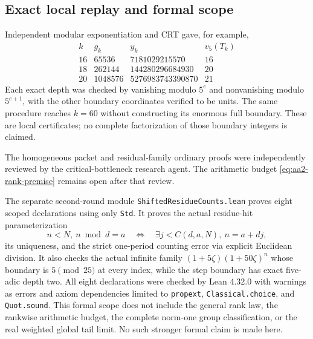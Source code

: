 \subsection{Exact local replay and formal scope}
Independent modular exponentiation and CRT gave, for example,
\[
\begin{array}{c|r|r|c}
k&g_k&y_k&v_5(T_k)\\\hline
16&65536&7181029215570&16\\
18&262144&144280296684930&20\\
20&1048576&5276983743390870&21
\end{array}
\]
Each exact depth was checked by vanishing modulo $5^e$ and nonvanishing
modulo $5^{e+1}$, with the other boundary coordinates verified to be units.
The same procedure reaches $k=60$ without constructing its enormous full
boundary. These are local certificates; no complete factorization of those
boundary integers is claimed.

The homogeneous packet and residual-family ordinary proofs were independently
reviewed by the critical-bottleneck research agent. The arithmetic budget
\eqref{eq:aa2-rank-premise} remains open after that review.

The separate second-round module \texttt{ShiftedResidueCounts.lean} proves
eight scoped declarations using only \texttt{Std}. It proves the actual
residue-hit parameterization
\[
 n<N,\ n\bmod d=a
 \quad\Longleftrightarrow\quad
 \exists j<C(d,a,N),\ n=a+dj,
\]
its uniqueness, and the strict one-period counting error via explicit
Euclidean division. It also checks the actual infinite family
$(1+5\zeta)(1+50\zeta)^n$ whose boundary is $5\pmod{25}$ at every index,
while the step boundary has exact five-adic depth two. All eight declarations
were checked by Lean 4.32.0 with warnings as errors and axiom dependencies
limited to \texttt{propext}, \texttt{Classical.choice}, and \texttt{Quot.sound}.
This formal scope does not include the general rank law, the rankwise
arithmetic budget, the complete norm-one group classification, or the real
weighted global tail limit. No such stronger formal claim is made here.
